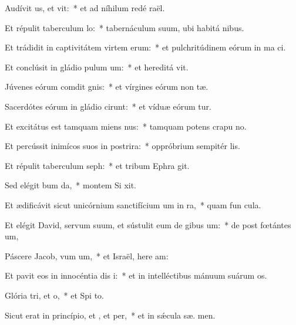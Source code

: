 \item Audívit us, et vit:~* et ad níhilum redé  raël.
\item Et répulit taberculum lo:~* tabernáculum suum, ubi habitá  nibus.
\item Et trádidit in captivitátem virtem erum:~* et pulchritúdinem eórum in ma ci.
\item Et conclúsit in gládio pulum um:~* et hereditá  vit.
\item Júvenes eórum comdit gnis:~* et vírgines eórum non  tæ.
\item Sacerdótes eórum in gládio cirunt:~* et víduæ eórum  tur.
\item Et excitátus est tamquam miens nus:~* tamquam potens crapu  no.
\item Et percússit inimícos suos in postrira:~* oppróbrium sempitér  lis.
\item Et répulit taberculum seph:~* et tribum Ephra  git.
\item Sed elégit bum da,~* montem Si  xit.
\item Et ædificávit sicut unicórnium sanctifícium um in ra,~* quam fun  cula.
\item Et elégit David, servum suum, et sústulit eum de gibus um:~* de post fœtántes  um,
\item Páscere Jacob, vum um,~* et Israël, here am:
\item Et pavit eos in innocéntia dis i:~* et in intelléctibus mánuum suárum  os.
\item Glória tri, et o,~* et Spi to.
\item Sicut erat in princípio, et , et per,~* et in sǽcula sæ. men.
